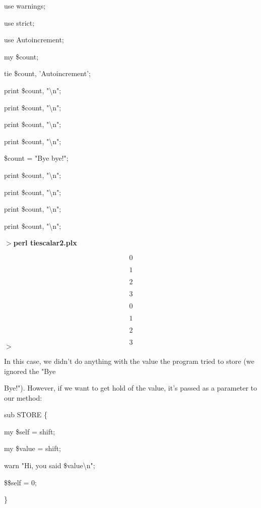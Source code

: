 \documentclass[a4paper,11pt]{book}
\begin{document}
\noindent use warnings;

\noindent use strict;

\noindent use Autoincrement;

\noindent 

\noindent my \$count;

\noindent tie \$count, 'Autoincrement';

\noindent print \$count, "\textbackslash n";

\noindent print \$count, "\textbackslash n";

\noindent print \$count, "\textbackslash n";

\noindent print \$count, "\textbackslash n";

\noindent \$count = "Bye bye!";

\noindent print \$count, "\textbackslash n";

\noindent print \$count, "\textbackslash n";

\noindent print \$count, "\textbackslash n";

\noindent print \$count, "\textbackslash n";

\noindent 

\noindent $>$\textbf{perl tiescalar2.plx}

\[0\] 

\[1\] 

\[2\] 

\[3\] 

\[0\] 

\[1\] 

\[2\] 

\[3\] 
$>$

\noindent 

\noindent In this case, we didn't do anything with the value the program tried to store (we ignored the "Bye

\noindent Bye!"). However, if we want to get hold of the value, it's passed as a parameter to our method:

\noindent 

\noindent 

\noindent sub STORE \{

\noindent my \$self  = shift;

\noindent my \$value = shift;

\noindent warn "Hi, you said \$value\textbackslash n";

\noindent \$\$self = 0;

\noindent \}

\noindent 
\end{document}

